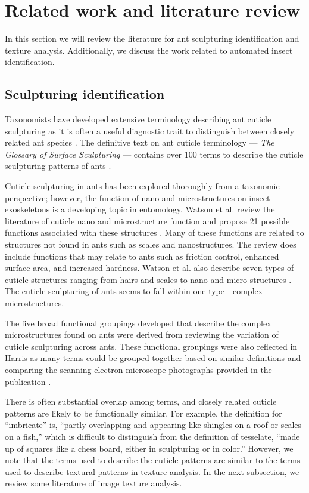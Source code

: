 \documentclass{aci}
\numberwithin{equation}{section}
\begin{document}
\section{Related work and literature review}

In this section we will review the literature for ant sculpturing identification
and texture analysis. Additionally, we discuss the work related to automated
insect identification.

\subsection{Sculpturing identification}
Taxonomists have developed extensive terminology describing ant cuticle
sculpturing as it is often a useful diagnostic trait to distinguish between
closely related ant species \cite{blaimer_taxonomy_2019,fisher_ants_2007}. The
definitive text on ant cuticle terminology — \textit{The Glossary of Surface
    Sculpturing} — contains over 100 terms to describe the cuticle sculpturing
patterns of ants \cite{harris_glossary_1979}.

Cuticle sculpturing in ants has been explored thoroughly from a taxonomic
perspective; however, the function of nano and microstructures on insect
exoskeletons is a developing topic in entomology. Watson et al. review the
literature of cuticle nano and microstructure function and propose 21 possible
functions associated with these structures \cite{watson_diversity_2017}. Many of
these functions are related to structures not found in ants such as scales and
nanostructures. The review does include functions that may relate to ants such
as friction control, enhanced surface area, and increased hardness. Watson et
al. also describe seven types of cuticle structures ranging from hairs and
scales to nano and micro structures \cite{watson_diversity_2017}. The cuticle
sculpturing of ants seems to fall within one type - complex microstructures.

The five broad functional groupings developed that describe the complex
microstructures found on ants were derived from reviewing the variation of
cuticle sculpturing across ants. These functional groupings were also reflected
in Harris as many terms could be grouped together based on similar definitions
and comparing the scanning electron microscope photographs provided in the
publication \cite{harris_glossary_1979}.

There is often substantial overlap among terms, and closely related cuticle
patterns are likely to be functionally similar. For example, the definition for
“imbricate” is, “partly overlapping and appearing like shingles on a roof or
scales on a fish,” which is difficult to distinguish from the definition of
tesselate, “made up of squares like a chess board, either in sculpturing or in
color.” However, we note that the terms used to describe the cuticle patterns
are similar to the terms used to describe textural patterns in texture analysis.
In the next subsection, we review some literature of image texture analysis.
\end{document}
